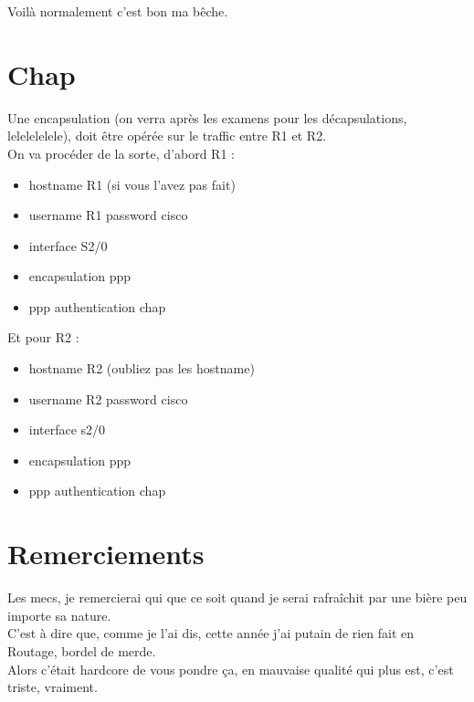 \documentclass[a4paper,10pt,final,fleqn]{article}
\begin{document}
	Voilà normalement c'est bon ma bêche.\\

\section{Chap}

	Une encapsulation (on verra après les examens pour les décapsulations, lelelelelele), doit être opérée sur le traffic entre R1 et R2.\\

	On va procéder de la sorte, d'abord R1 : \\

	\begin{itemize}
		\item hostname R1 (si vous l'avez pas fait)
		\item username R1 password cisco
		\item interface S2/0
		\item encapsulation ppp
		\item ppp authentication chap\\
	\end{itemize}

	Et pour R2 : \\

	\begin{itemize}
		\item hostname R2 (oubliez pas les hostname)
		\item username R2 password cisco
		\item interface s2/0
		\item encapsulation ppp
		\item ppp authentication chap\\
	\end{itemize}

\section{Remerciements}

	Les mecs, je remercierai qui que ce soit quand je serai rafraîchit par une bière peu importe sa nature.\\

	C'est à dire que, comme je l'ai dis, cette année j'ai putain de rien fait en Routage, bordel de merde.\\

	Alors c'était hardcore de vous pondre ça, en mauvaise qualité qui plus est, c'est triste, vraiment.\\
\end{document}
